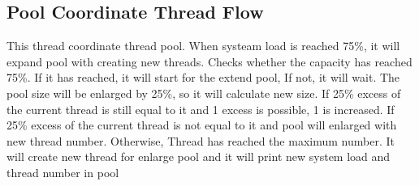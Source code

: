 \documentclass{article}
\begin{document}
\subsection{Pool Coordinate Thread Flow}
\noindent This thread coordinate thread pool. When systeam load is reached 75\%, it will expand pool with creating new threads.
\noindent Checks whether the capacity has reached 75\%. If it has reached, it will start for the extend pool, If not, it will wait.
\newline \noindent The pool size will be enlarged by 25\%, so it will calculate new size.
\newline \noindent If 25\% excess of the current thread is still equal to it and 1 excess is possible, 1 is increased.
\newline \noindent If 25\% excess of the current thread is not equal to it and pool will enlarged with new thread number.
\newline \noindent Otherwise, Thread has reached the maximum number.
\newline \noindent It will create new thread for enlarge pool and it will print new system load and thread number in pool 
\end{document}

